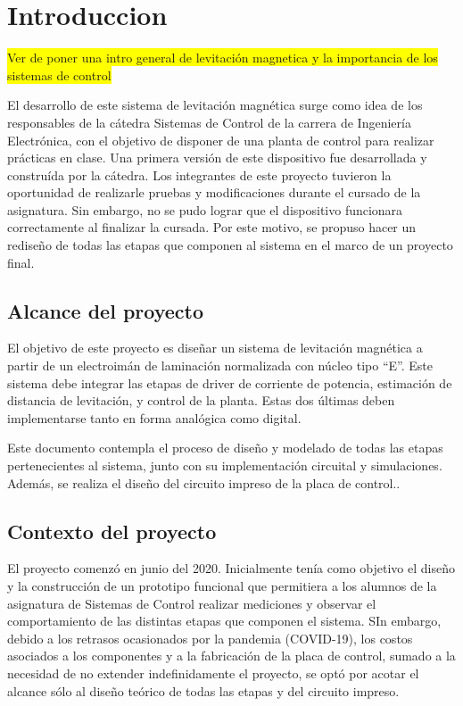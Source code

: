 \chapter{Introduccion}  \label{cap:Introducción}


\noindent \colorbox{yellow}{Ver de poner una intro general de levitación magnetica y la importancia de los sistemas de control}

\noindent El desarrollo de este sistema de levitación magnética surge como idea de los responsables de la cátedra Sistemas de Control de la carrera de Ingeniería Electrónica, con el objetivo de disponer de una planta de control para realizar prácticas en clase. Una primera versión de este dispositivo fue desarrollada y construída por la cátedra. Los integrantes de este proyecto tuvieron la oportunidad de realizarle pruebas y modificaciones durante el cursado de la asignatura. Sin embargo, no se pudo lograr que el dispositivo funcionara correctamente al finalizar la cursada. Por este motivo, se propuso hacer un rediseño de todas las etapas que componen al sistema en el marco de un proyecto final.


\section{Alcance del proyecto}

\noindent El objetivo de este proyecto es diseñar un sistema de levitación magnética a partir de un electroimán de laminación normalizada con núcleo tipo “E''. Este sistema debe integrar las etapas de driver de corriente de potencia, estimación de distancia de levitación, y control de la planta. Estas dos últimas deben implementarse tanto en forma analógica como digital.

\noindent Este documento contempla el proceso de diseño y modelado de todas las etapas pertenecientes al sistema, junto con su implementación circuital y simulaciones. Además, se realiza el diseño del circuito impreso de la placa de control..


\section{Contexto del proyecto}

\noindent El proyecto comenzó en junio del 2020. Inicialmente tenía como objetivo el diseño y la construcción de un prototipo funcional que permitiera a los alumnos de la asignatura de Sistemas de Control realizar mediciones y observar el comportamiento de las distintas etapas que componen el sistema. SIn embargo, debido a los retrasos ocasionados por la pandemia (COVID-19), los costos asociados a los componentes y a la fabricación de la placa de control, sumado a la  necesidad de no extender indefinidamente el proyecto, se optó por acotar el alcance sólo al diseño teórico de todas las etapas y del circuito impreso.

